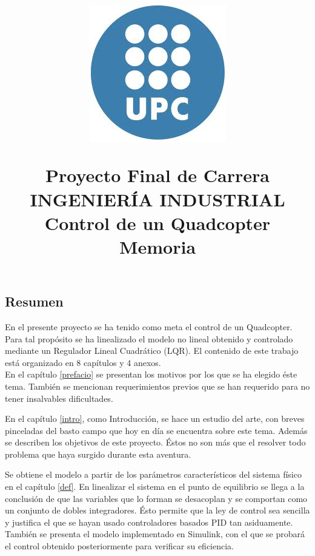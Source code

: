 \documentclass[twoside,11pt]{report}
\title{\begin{center} 
\includegraphics[scale=0.3]{images/upc.jpg} 
\end{center} 
\vspace{0cm} 
Proyecto Final de Carrera\\
INGENIERÍA INDUSTRIAL \\
\vspace{0cm} 
\Huge{Control de un Quadcopter} 
\vspace{0cm} \\ 
Memoria}
\date{}
\begin{document}
\onehalfspacing
\maketitle

\thispagestyle{empty}
\newpage
\begin{center}

\end{center}
\thispagestyle{empty}
\newpage
\setcounter{page}{1}

\begin{center}
\section*{Resumen}
\end{center}


En el presente proyecto se ha tenido como meta el control de un Quadcopter. Para tal propósito se ha linealizado  el modelo no lineal obtenido y controlado mediante un Regulador Lineal Cuadrático (LQR). El contenido de este trabajo está organizado en 8 capítulos y 4 anexos.\\

En el capítulo \ref{prefacio} se presentan los motivos por los que se ha elegido éste tema. También se mencionan requerimientos previos que se han requerido para no tener insalvables dificultades. 

En el capítulo \ref{intro}, como Introducción, se hace un estudio del arte, con breves pinceladas del basto campo que hoy en día se encuentra sobre este tema. Además se describen los objetivos de este proyecto. Éstos no son más que el resolver todo problema que haya surgido durante esta aventura.

Se obtiene el modelo a partir de los parámetros característicos del sistema físico en el capítulo \ref{def}. En linealizar el sistema en el punto de equilibrio se llega a la conclusión de que las variables que lo forman se desacoplan y se comportan como un conjunto de dobles integradores. Ésto permite que la ley de control sea sencilla y justifica el que se hayan usado controladores basados PID tan asiduamente. También se presenta el modelo implementado en Simulink, con el que se probará el control obtenido posteriormente para verificar su eficiencia.
\end{document}
